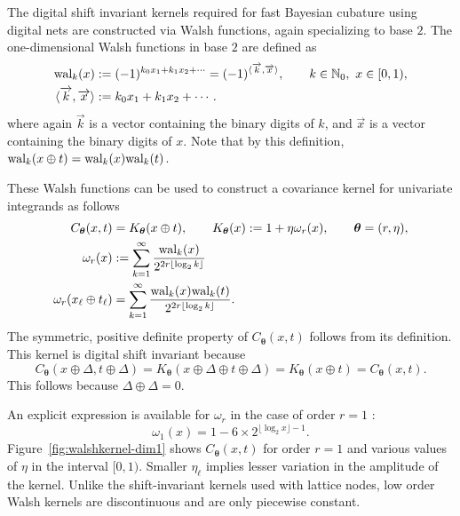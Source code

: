 \documentclass[graybox,footinfo]{svmult}
\newcommand{\bm}[1]{\boldsymbol{#1}}
\newcommand{\natzero}{\mathbb{N}_0}
\newcommand{\vtheta}{{\bm{\theta}}}
\newcommand{\ak}{\overrightarrow{k}}
\newcommand{\ax}{\overrightarrow{x}}
\newcommand\figref{Figure~\ref}
\begin{document}
The digital shift invariant kernels required for fast Bayesian cubature using digital nets are constructed via Walsh functions, again specializing to base $2$. 
The one-dimensional Walsh functions in base $2$ are defined as
\begin{align}
    \label{eqn:walsh_func}
\textup{wal}_{k}(x) & := (-1)^{k_0 x_1 + k_1 x_2 + \cdots} = (-1)^{\langle \ak, \ax \rangle},  \qquad k \in \natzero, \ x \in [0,1), \\
\nonumber
\langle \ak, \ax \rangle & : = k_{0} x_{1} + k_{1} x_{2} + \cdots .
\end{align}
where again $\ak$ is a vector containing the binary digits of $k$, and $\ax$ is a vector containing the binary digits of $x$.  Note that by this definition, $\textup{wal}_{k}(x \oplus t) =  \textup{wal}_{k}(x) \textup{wal}_{k}(t)$.  

These Walsh functions can be used to construct a covariance kernel for univariate integrands as follows
\begin{align*}
    C_\vtheta (x,t) & = K_\vtheta(x \oplus t), \qquad K_\vtheta(x) : = 1 + \eta \omega_{r} (x), \qquad \vtheta = (r,\eta), \\
    \omega_r(x) & := \sum_{k=1}^\infty \frac{\textup{wal}_{k}(x) }{2^{2r \lfloor \log_2 k \rfloor}} \\
    \omega_{r} (x_\ell \oplus t_\ell) & = \sum_{k=1}^\infty \frac{\textup{wal}_{k}(x) \textup{wal}_{k}(t)  }{2^{2r \lfloor \log_2 k \rfloor}}.
\end{align*}
The symmetric, positive definite property of $ C_\vtheta (x,t)$ follows from its definition.  This kernel is digital shift invariant because 
\[
C_\vtheta (x \oplus \Delta ,t \oplus \Delta ) = K_\vtheta(x \oplus \Delta \oplus t \oplus \Delta) = K_\vtheta(x \oplus t) =  C_\vtheta (x,t).
\]
This follows because $\Delta \oplus \Delta = 0$.

An explicit expression is available for $\omega_{r}$ in the case of order $r=1$ \cite{Nuyens2013}:
\begin{equation}
\label{eqn:omega1}
\omega_1(x) 
= 1  - 6 \times 2^{\lfloor \log_2 x \rfloor -1 }.
\end{equation}
\figref{fig:walshkernel-dim1} shows $C_\vtheta (x,t)$ for order $r=1$ and various values of $\eta$ in the interval $[0,1)$. Smaller $\eta_\ell$ implies lesser variation in the amplitude of the kernel.  Unlike the shift-invariant kernels used with lattice nodes, low order Walsh kernels are discontinuous and are only piecewise constant. 
\end{document}
